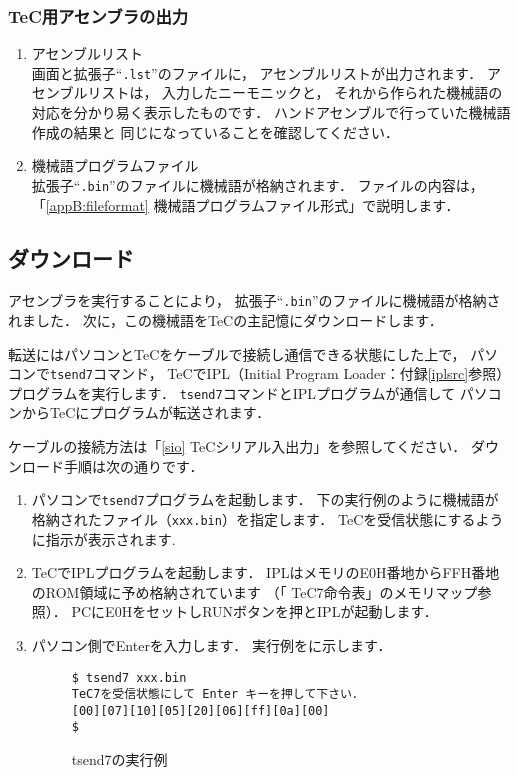 \subsubsection{TeC用アセンブラの出力}

\begin{enumerate}
\item アセンブルリスト\\
画面と拡張子``{\tt .lst}''のファイルに，
アセンブルリストが出力されます．
アセンブルリストは，
入力したニーモニックと，
それから作られた機械語の対応を分かり易く表示したものです．
ハンドアセンブルで行っていた機械語作成の結果と
同じになっていることを確認してください．

\item 機械語プログラムファイル\\
拡張子``{\tt .bin}''のファイルに機械語が格納されます．
ファイルの内容は，
「\ref{appB:fileformat} 機械語プログラムファイル形式」で説明します．
\end{enumerate}

\subsection{ダウンロード}

アセンブラを実行することにより，
拡張子``{\tt .bin}''のファイルに機械語が格納されました．
次に，この機械語をTeCの主記憶にダウンロードします．

転送にはパソコンとTeCをケーブルで接続し通信できる状態にした上で，
パソコンで{\tt tsend7}コマンド，
TeCでIPL（Initial Program Loader：付録\ref{iplsrc}参照）
プログラムを実行します．
{\tt tsend7}コマンドとIPLプログラムが通信して
パソコンからTeCにプログラムが転送されます．

ケーブルの接続方法は「\ref{sio} TeCシリアル入出力」を参照してください．
ダウンロード手順は次の通りです．
\begin{enumerate}
\item パソコンで{\tt tsend7}プログラムを起動します．
下の実行例のように機械語が格納されたファイル（{\tt xxx.bin}）を指定します．
TeCを受信状態にするように指示が表示されます.

\item TeCでIPLプログラムを起動します．
IPLはメモリのE0H番地からFFH番地のROM領域に予め格納されています
（「 TeC7命令表」のメモリマップ参照）．
PCにE0HをセットしRUNボタンを押とIPLが起動します．

\item パソコン側でEnterを入力します．
実行例をに示します．

\begin{figure}[bt]
{\small\begin{lstlisting}[numbers=none]
$ tsend7 xxx.bin
TeC7を受信状態にして Enter キーを押して下さい．
[00][07][10][05][20][06][ff][0a][00]
$
\end{lstlisting}}
\caption{tsend7の実行例}
\label{fig:chap6:tsend7}
\end{figure}

\end{enumerate}

